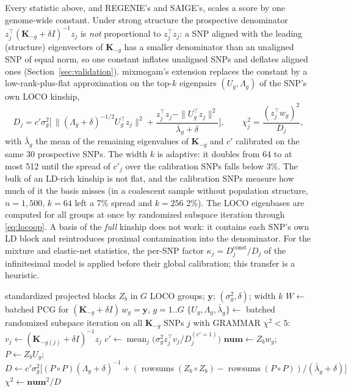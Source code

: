\documentclass[11pt]{article}
\newcommand{\y}{\mathbf{y}}
\newcommand{\K}{\mathbf{K}}
\begin{document}
Every statistic above, and REGENIE's and SAIGE's, scales a score by one
genome-wide constant. Under strong structure the prospective
denominator $z_j^\top(\K_{-g}+\delta I)^{-1}z_j$ is \emph{not}
proportional to $z_j^\top z_j$: a SNP aligned with the leading
(structure) eigenvectors of $\K_{-g}$ has a smaller denominator than an
unaligned SNP of equal norm, so one constant inflates unaligned SNPs and
deflates aligned ones (Section~\ref{sec:validation}). mixmogam's
extension replaces the constant by a low-rank-plus-flat approximation
on the top-$k$ eigenpairs $(U_g, \Lambda_g)$ of the SNP's own LOCO
kinship,
\begin{equation}
  D_j = c'\sigma_g^2\Big[\,\|(\Lambda_g + \delta)^{-1/2}U_g^\top z_j\|^2
  + \frac{z_j^\top z_j - \|U_g^\top z_j\|^2}{\bar\lambda_g + \delta}\Big],
  \qquad \chi^2_j = \frac{(z_j^\top w_g)^2}{D_j},
  \label{eq:spectral}
\end{equation}
with $\bar\lambda_g$ the mean of the remaining eigenvalues of
$\K_{-g}$ and $c'$ calibrated on the same 30 prospective SNPs. The width
$k$ is adaptive: it doubles from 64 to at most 512 until the spread of
$c'_j$ over the calibration SNPs falls below 3\%. The bulk of an
LD-rich kinship is not flat, and the calibration SNPs measure how much
of it the basis misses (in a coalescent sample without population
structure, $n = 1{,}500$, $k = 64$ left a 7\% spread and $k = 256$ 2\%). The LOCO
eigenbases are computed for all groups at once by randomized subspace
iteration through \eqref{eq:locoop}. A basis of the \emph{full} kinship
does not work: it contains each SNP's own LD block and reintroduces
proximal contamination into the denominator. For the mixture and
elastic-net statistics, the per-SNP factor
$\kappa_j = D_j^{\mathrm{const}}/D_j$ of the infinitesimal model is
applied before their global calibration; this transfer is a heuristic.

\begin{algorithm}[t]
\caption{BOLT-LMM-inf with the structure-aware denominator}
\label{alg:spectral}
\begin{algorithmic}[1]
\Require standardized projected blocks $Z_b$ in $G$ LOCO groups; $\y$; $(\sigma_g^2,\delta)$; width $k$
\State $W \gets$ batched PCG for $(\K_{-g}+\delta I)\,w_g = \y$, $g = 1..G$ 
\State $\{U_g,\Lambda_g,\bar\lambda_g\} \gets$ batched randomized subspace iteration on all $\K_{-g}$
 SNPs $j$ with GRAMMAR $\chi^2<5$: $v_j \gets (\K_{-g(j)}+\delta I)^{-1}z_j$ 
\State $c' \gets \operatorname{mean}_j\big(\sigma_g^2 z_j^\top v_j / D_j^{(c'=1)}\big)$
  \State $\mathbf{num} \gets Z_b w_g$;\quad $P \gets Z_b U_g$;\quad $D \gets c'\sigma_g^2\big[(P\circ P)(\Lambda_g{+}\delta)^{-1} + (\operatorname{rowsums}(Z_b\circ Z_b) - \operatorname{rowsums}(P\circ P))/(\bar\lambda_g{+}\delta)\big]$
  \State $\chi^2 \gets \mathbf{num}^2/D$
\EndFor
\end{algorithmic}
\end{algorithm}
\end{document}
